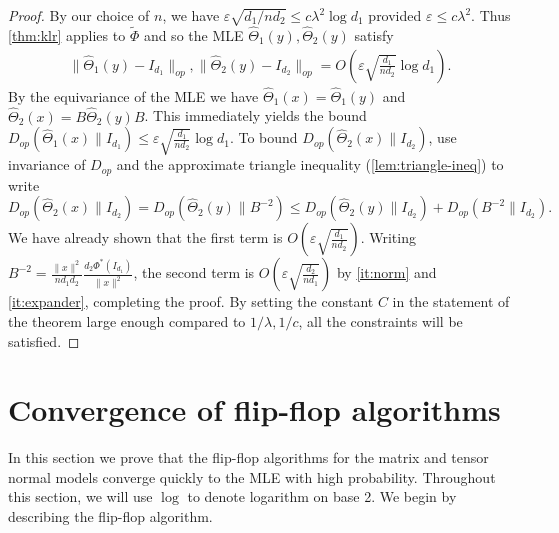 \documentclass[aos]{imsart}
\theoremstyle{definition}
\numberwithin{equation}{section}
\newcommand{\htheta}{\widehat{\Theta}}
\newcommand{\eps}{\varepsilon}
\begin{document}
\begin{proof}
By our choice of $n$, we have $\eps \sqrt{d_1/nd_2} \leq c\lambda^2\log d_1$ provided $\eps \leq c\lambda^2$. Thus \cref{thm:klr} applies to $\tilde{\Phi}$ and so the MLE $\htheta_1(y), \htheta_2(y)$ satisfy
\begin{gather*} \| \htheta_1(y) - I_{d_1}\|_{op}, \| \htheta_2(y) - I_{d_2}\|_{op} = O\left(\eps \sqrt{\frac{d_1}{n d_2}} \log d_1\right).\end{gather*}
By the equivariance of the MLE we have $\htheta_1(x) = \htheta_1(y)$ and $\htheta_2(x) = B \htheta_2 (y) B$. This immediately yields the bound $ D_{op}(\htheta_1(x) \rVert I_{d_1}) \leq \eps \sqrt{\frac{d_1}{n d_2}} \log d_1.$
To bound $D_{op}(\htheta_2(x) \rVert I_{d_2})$, use invariance of $D_{op}$ and the approximate triangle inequality (\cref{lem:triangle-ineq}) to write
$$D_{op}(\htheta_2(x) \rVert I_{d_2}) = D_{op}(\htheta_2(y) \rVert B^{-2}) \leq D_{op}(\htheta_2(y)\rVert I_{d_2}) + D_{op}(B^{-2}\rVert I_{d_2}).$$
We have already shown that the first term is $O(\eps \sqrt{\frac{d_1}{n d_2}}).$ Writing $B^{-2} = \frac{\|x\|^2}{nd_1 d_2} \frac{d_2 \Phi^*(I_{d_1})}{\|x\|^2}$, the second term is $O(\eps \sqrt{\frac{d_2}{n d_1}})$ by \cref{it:norm} and \cref{it:expander}, completing the proof.  By setting the constant $C$ in the statement of the theorem large enough compared to $1/\lambda, 1/c$, all the constraints will be satisfied.
\end{proof}








\newpage
\section{Convergence of flip-flop algorithms}

In this section we prove that the flip-flop algorithms for the matrix and tensor normal models converge quickly to the MLE with high probability.
Throughout this section, we will use $\log$ to denote logarithm on base 2.
We begin by describing the flip-flop algorithm.
\end{document}
